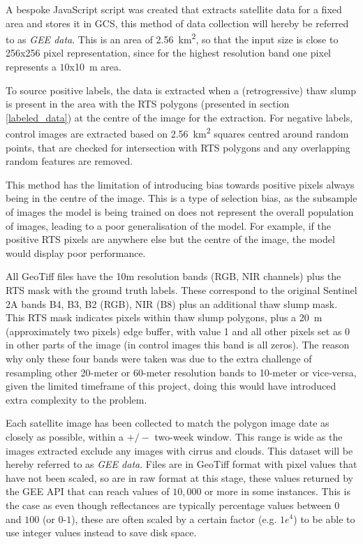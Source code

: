 A bespoke JavaScript script was created that extracts satellite data for a fixed area and stores it in \gls{GCS}, this method of data collection will hereby be referred to as \textit{\gls{GEE} data}. This is an area of \SI{2.56}{\kilo\metre\squared}, so that the input size is close to 256x256 pixel representation, since for the highest resolution band one pixel represents a $10$x\SI{10}{\metre} area.

To source positive labels, the data is extracted when a (retrogressive) thaw slump is present in the area with the \gls{RTS} polygons (presented in section \ref{labeled_data}) at the centre of the image for the extraction.
For negative labels, control images are extracted based on \SI{2.56}{\kilo\metre\squared} squares centred around random points, that are checked for intersection with \gls{RTS} polygons and any overlapping random features are removed. 

This method has the limitation of introducing bias towards positive pixels always being in the centre of the image. This is a type of selection bias, as the subsample of images the model is being trained on does not represent the overall population of images, leading to a poor generalisation of the model. For example, if the positive \gls{RTS} pixels are anywhere else but the centre of the image, the model would display poor performance.

All GeoTiff files have the 10m resolution bands (\gls{RGB}, \gls{NIR} channels) plus the \gls{RTS} mask with the ground truth labels. These correspond to the original Sentinel 2A bands B4, B3, B2 (\gls{RGB}), \gls{NIR} (B8) plus an additional thaw slump mask. This \gls{RTS} mask indicates pixels within thaw slump polygons, plus a \SI{20}{\metre} (approximately two pixels) edge buffer, with value 1 and all other pixels set as 0 in other parts of the image (in control images this band is all zeros). The reason why only these four bands were taken was due to the extra challenge of resampling other 20-meter or 60-meter resolution bands to 10-meter or vice-versa, given the limited timeframe of this project, doing this would have introduced extra complexity to the problem.

Each satellite image has been collected to match the polygon image date as closely as possible, within a $+/-$ two-week window. This range is wide as the images extracted exclude any images with cirrus and clouds. This dataset will be hereby referred to as \textit{\gls{GEE} data}.
Files are in GeoTiff format with pixel values that have not been scaled, so are in raw format at this stage, these values returned by the \gls{GEE} API that can reach values of $10,000$ or more in some instances. This is the case as even though reflectances are typically percentage values between $0$ and $100$ (or $0$-$1$), these are often scaled by a certain factor (e.g. $1 e^4$) to be able to use integer values instead to save disk space. 

